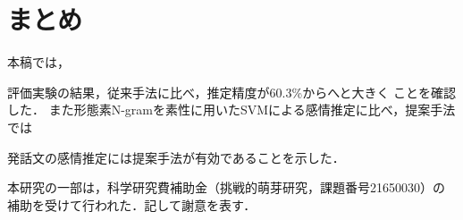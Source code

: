 \documentclass[japanese]{jnlp_1.4}
\def\resp#1{}
\begin{document}
\section{まとめ}\label{sec:conclusion}

本稿では，\resp{``感情が異なっていても，たまたま表現や文型が類似している文''や，
``コーパスを構築する際に誤って分類された文''の影響を改善し，高い精度で感
情推定を実現するための類似度計算手法であるRECAREを提案した．}

\resp{入力文で使われている形態素N-gramが，各感情コーパス間でどの程度偏って
いるか，といったことを表す値であるFPを定義し，BLEUをベースとした類似度
計算に導入した．更に，高次のN-gramに対する学習サンプル数の不足からくる，
いわゆる「ゼロ頻度問題」に対処するため，相乗平均で計算されるBLEUをベースと
した類似度を変形し，相加平均を用いて類似度計算を行う方法を提案した．}

評価実験の結果，従来手法に比べ，推定精度が60.3\%から\resp{81.8{\%}}へと大きく
\resp{向上し，また問題としていた2種類の文のうち，特に``たまたま表現や文型
が類似している文''の影響を効果的に低減させている}ことを確認した．
また形態素N-gramを素性に用いたSVMによる感情推定に比べ，提案手法では
\resp{N が大きい場合に推定精度の低下がほとんど見られず，}
発話文の感情推定には提案手法が有効であることを示した．

\resp{今後，「希望」や「自信」，「脅迫」といった
更に複雑な感情を加えた時の性能の評価，
また，必要があれば
推定結果として複数の感情を出力することが可能となるようなアルゴリズム
の改善について検討を行う予定である．}







\acknowledgment

本研究の一部は，科学研究費補助金（挑戦的萌芽研究，課題番号21650030）の
補助を受けて行われた．記して謝意を表す．
\end{document}
